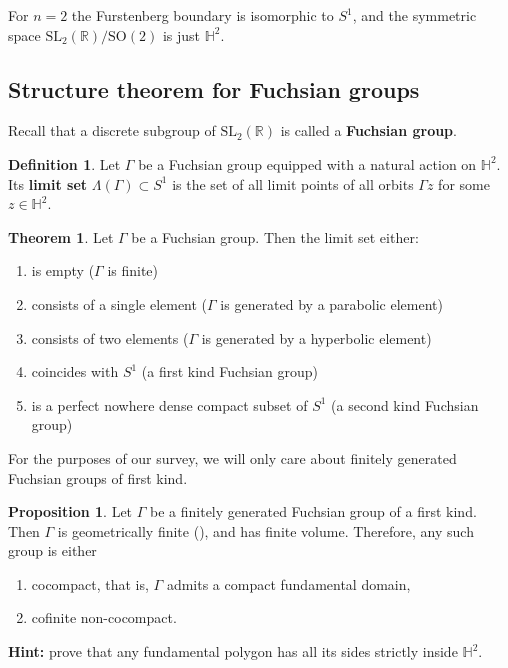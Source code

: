 \documentclass[11pt]{amsart}
\theoremstyle{definition}
\newtheorem{definition}{Definition}[section]
\newtheorem{theorem}{Theorem}[section]
\newtheorem{proposition}{Proposition}[section]
\begin{document}
		For $n = 2$ the Furstenberg boundary is isomorphic to $S^1$, and the symmetric space $\text{SL}_2(\mathbb{R}) / \text{SO}(2)$ is just $\mathbb{H}^2$.
		
		\subsection{Structure theorem for Fuchsian groups}
		Recall that a discrete subgroup of $\text{SL}_2(\mathbb{R})$ is called a \textbf{Fuchsian group}.
		
		\begin{definition}
			Let $\Gamma$ be a Fuchsian group equipped with a natural action on $\mathbb{H}^2$. Its \textbf{limit set} $\Lambda(\Gamma) \subset S^1$ is the set of all limit points of all orbits $\Gamma z$ for some $z \in \mathbb{H}^2$. 
		\end{definition}
		\begin{theorem}
			\label{classification of Fuchsian}
			Let $\Gamma$ be a Fuchsian group. Then the limit set either:
			\begin{enumerate}
				\item is empty ($\Gamma$ is finite)
				\item consists of a single element ($\Gamma$ is generated by a parabolic element)
				\item consists of two elements ($\Gamma$ is generated by a hyperbolic element)
				\item coincides with $S^1$ (a first kind Fuchsian group)
				\item is a perfect nowhere dense compact subset of $S^1$ (a second kind Fuchsian group) 
			\end{enumerate}
		\end{theorem}
		
		For the purposes of our survey, we will only care about finitely generated Fuchsian groups of first kind.
		
		
		\begin{proposition}
			\label{classification of first kind}
			Let $\Gamma$ be a finitely generated Fuchsian group of a first kind. Then $\Gamma$ is geometrically finite (\cite[Theorem 4.6.1]{book:291162}), and has finite volume. Therefore, any such group is either
			\begin{enumerate}
				\item cocompact, that is, $\Gamma$ admits a compact fundamental domain,
				\item cofinite non-cocompact.
			\end{enumerate} 
		\end{proposition}
		\textbf{Hint:} prove that any fundamental polygon has all its sides strictly inside $\mathbb{H}^2$.
			
\end{document}

